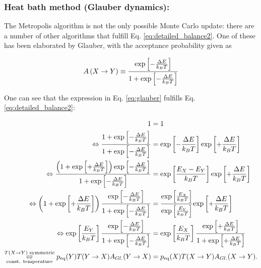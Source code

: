  
 \subsubsection*{Heat bath method (Glauber dynamics):}
The Metropolis algorithm is not the only possible Monte Carlo update: there are a number of other algorithms that fulfill Eq. \eqref{eq:detailed_balance2}. One of these has been elaborated by Glauber, with the acceptance probability given as

 \begin{equation}
A\left(X\rightarrow Y\right) \equiv \frac{ \text{exp}\left[ - \frac{\Delta E}{k_B T} \right]}  {    1 + \text{exp}\left[ - \frac{\Delta E}{k_B T}\right]     }
\label{eq:glauber}
\end{equation}

One can see that the expression in Eq. \eqref{eq:glauber} fulfills Eq. \eqref{eq:detailed_balance2}:
 
 
 \begin{align*}
1 &= 1 \\
\Leftrightarrow  \frac{ 1 + \text{exp}\left[ - \frac{\Delta E}{k_B T} \right]  }  {    1 + \text{exp}\left[ - \frac{\Delta E}{k_B T}\right] } &= \text{exp}\left[ -\frac{\Delta E}{k_B T} \right]   \text{exp}\left[ +\frac{\Delta E}{k_B T} \right]  \\
\Leftrightarrow    \frac{ \left(1 + \text{exp}\left[ +\frac{\Delta E}{k_B T}\right] \right)\text{exp}\left[ - \frac{\Delta E}{k_B T} \right]}  {    1 + \text{exp}\left[ - \frac{\Delta E}{k_B T}\right]     }  &= \text{exp}\left[\frac{ E_X-E_Y}{k_B T} \right]   \text{exp}\left[ +\frac{\Delta E}{k_B T} \right]   \\
\Leftrightarrow    \left(1 + \text{exp}\left[ +\frac{\Delta E}{k_B T}\right] \right)\frac{ \text{exp}\left[ - \frac{\Delta E}{k_B T} \right]}  {    1 + \text{exp}\left[ - \frac{\Delta E}{k_B T}\right]     }  &= \frac{\text{exp}\left[\frac{ E_X}{k_B T} \right]}{\text{exp}\left[ \frac{E_Y}{k_B T} \right] }     \text{exp}\left[ +\frac{\Delta E}{k_B T} \right]   \\
\Leftrightarrow  \text{exp}\left[ \frac{E_Y}{k_B T} \right]    \frac{ \text{exp}\left[ - \frac{\Delta E}{k_B T} \right]}  {    1 + \text{exp}\left[ - \frac{\Delta E}{k_B T}\right]     }  &= \text{exp}\left[\frac{ E_X}{k_B T} \right]    \frac{ \text{exp}\left[ +\frac{\Delta E}{k_B T} \right]}  {    1 + \text{exp}\left[ +\frac{\Delta E}{k_B T}\right]     } \\
\underset{\text{const. temperature}}{\overset{T(X\rightarrow Y)\text{ symmetric}}{\Leftrightarrow}}  {p_{\text{eq}}(Y)T(Y\rightarrow X) A_{Gl.}(Y\rightarrow X)}  &= {p_{	\text{eq}}(X)T(X\rightarrow Y) A_{Gl.}(X\rightarrow Y)}.
\end{align*}
 
